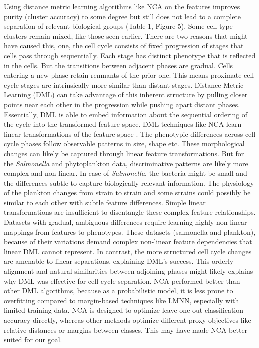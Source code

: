 \documentclass[12pt,a4paper]{article}
\begin{document}
Using distance metric learning algorithms like NCA on the features improves purity (cluster accuracy) to some degree but still does not lead to a complete separation of relevant biological groups (Table 1, Figure 5). Some cell type clusters remain mixed, like those seen earlier. There are two reasons that might have caused this, one, the cell cycle consists of fixed progression of stages that cells pass through sequentially. Each stage has distinct phenotype that is reflected in the cells. But the transitions between adjacent phases are gradual. Cells entering a new phase retain remnants of the prior one.
This means proximate cell cycle stages are intrinsically more similar than distant stages. Distance Metric Learning (DML) can take advantage of this inherent structure by pulling closer points near each other in the progression while pushing apart distant phases. Essentially, DML is able to embed information about the sequential ordering of the cycle into the transformed feature space. DML techniques like NCA learn linear transformations of the feature space \cite{NCA}. The phenotypic differences across cell cycle phases follow observable patterns in size, shape etc. These morphological changes can likely be captured through linear feature transformations. But for the \textit{Salmonella} and phytoplankton data, discriminative patterns are likely more complex and non-linear. In case of \textit{Salmonella}, the bacteria might be small and the differences subtle to capture biologically relevant information. The physiology of the plankton changes from strain to strain and some strains could possibly be similar to each other with subtle feature differences. Simple linear transformations are insufficient to disentangle these complex feature relationships. Datasets with gradual, ambiguous differences require learning highly non-linear mappings from features to phenotypes. These datasets (salmonella and plankton), because of their variations demand complex non-linear feature dependencies that linear DML cannot represent. In contrast, the more structured cell cycle changes are amenable to linear separations, explaining DML's success. This orderly alignment and natural similarities between adjoining phases might likely explains why DML was effective for cell cycle separation. NCA performed better than other DML algorithms, because as a probabilistic model, it is less prone to overfitting compared to margin-based techniques like LMNN, especially with limited training data. NCA is designed to optimize leave-one-out classification accuracy directly, whereas other methods optimize different proxy objectives like relative distances or margins between classes. This may have made NCA better suited for our goal.
\end{document}
